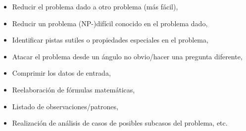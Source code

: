 \begin{itemize}
	\item Reducir el problema dado a otro problema (más fácil),
	\item Reducir un problema (NP-)difícil conocido en el problema dado,
	\item Identificar pistas sutiles o propiedades especiales en el problema,
	\item Atacar el problema desde un ángulo no obvio/hacer una pregunta diferente,
	\item Comprimir los datos de entrada,
	\item Reelaboración de fórmulas matemáticas,
	\item Listado de observaciones/patrones,
	\item Realización de análisis de casos de posibles subcasos del problema, etc.
\end{itemize}